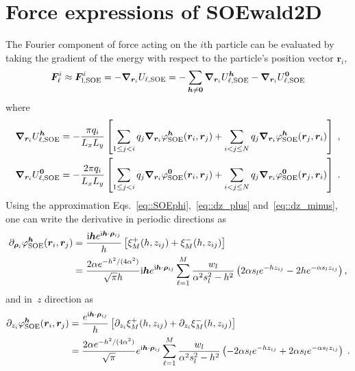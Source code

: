 \section{Force expressions of SOEwald2D} \label{app::force}

The Fourier component of force acting on the $i$th particle can be evaluated by taking the gradient of the energy with respect to the particle's position vector $\bm{r}_{i}$,
\begin{equation}\label{eq::Fi}
	\boldsymbol{F}_{\ell}^i  \approx \boldsymbol{F}^{i}_{\text{l},\text{SOE}} = -\boldsymbol{\nabla}_{\boldsymbol{r}_{i}} U_{\ell,\text{SOE}} =  -\sum_{\bm{h}\neq \bm{0}} \boldsymbol{\nabla}_{\boldsymbol{r}_{i}}U_{\ell,\text{SOE}}^{\boldsymbol{h}} -\boldsymbol{\nabla}_{\boldsymbol{r}_{i}} U_{\ell,\text{SOE}}^{\boldsymbol{0}}
\end{equation}
where
\begin{align}    
	\boldsymbol{\nabla}_{\boldsymbol{r}_{i}}U_{\ell,\text{SOE}}^{\boldsymbol{h}} &= - \frac{\pi q_{i}}{L_x L_y} \left[ \sum_{1 \leq j < i} q_{j} \boldsymbol{\nabla}_{\boldsymbol{r}_{i}} \varphi_{\text{SOE}}^{\boldsymbol{h}}(\boldsymbol{r}_{i}, \boldsymbol{r}_{j}) +  \sum_{i < j \leq N} q_{j} \boldsymbol{\nabla}_{\boldsymbol{r}_{i}} \varphi_{\text{SOE}}^{\boldsymbol{h}}(\boldsymbol{r}_{j}, \boldsymbol{r}_{i}) \right]\;,\\
	\boldsymbol{\nabla}_{\boldsymbol{r}_{i}} U_{\ell,\text{SOE}}^{\boldsymbol{0}} &= - \frac{2 \pi q_{i}}{L_x L_y} \left[ \sum_{1 \leq j < i} q_{j} \boldsymbol{\nabla}_{\boldsymbol{r}_{i}} \varphi^{\bm{0}}_{\text{SOE}}(\bm{r}_{i}, \bm{r}_{j}) + \sum_{i < j \leq N} q_{j} \boldsymbol{\nabla}_{\boldsymbol{r}_{i}} \varphi^{\bm{0}}_{\text{SOE}}(\bm{r}_{j}, \bm{r}_{i})\right]\;.
\end{align}
Using the approximation Eqs.~\eqref{eq::SOEphi},~\eqref{eq::dz_plus} and~\eqref{eq::dz_minus}, one can write the derivative in periodic directions as
\begin{equation}
	\begin{split}
		\partial_{\bm{\rho}_{i}} \varphi_{\text{SOE}}^{\boldsymbol{h}}(\boldsymbol{r}_{i}, \boldsymbol{r}_{j}) & = \frac{\mathrm{i} \boldsymbol{h} e^{ \mathrm{i} \boldsymbol{h} \cdot \boldsymbol{\rho}_{ij}}}{h} \left[\xi^{+}_M(h, z_{ij})+\xi^{-}_M(h, z_{ij})\right]\\
		&=\frac{2\alpha e^{-h^2/(4\alpha^2)}}{\sqrt{\pi}h} \mathrm{i} \bm{h}e^{\mathrm{i} \boldsymbol{h} \cdot \boldsymbol{\rho}_{ij}} \sum_{\ell = 1}^{M}  \frac{w_l}{\alpha^2 s_l^2 - h^2}\left( 2 \alpha s_l e^{-h z_{ij}} - 2 h e^{-\alpha s_l z_{ij}}\right),
	\end{split}
\end{equation}
and in~$z$ direction as
\begin{equation}\label{eq:z-der}
	\begin{split}
		\partial_{z_{i}} \varphi_{\text{SOE}}^{\boldsymbol{h}}(\boldsymbol{r}_{i}, \boldsymbol{r}_{j}) & = \frac{e^{\mathrm{i} \boldsymbol{h} \cdot \boldsymbol{\rho}_{ij}}}{h} \left[\partial_{z_{i}} \xi^{+}_M(h, z_{ij}) + \partial_{z_{i}} \xi^{-}_M(h, z_{ij})\right]\\
		&=\frac{2 \alpha e^{-h^2/(4\alpha^2)}}{\sqrt{\pi}}e^{ \mathrm{i} \boldsymbol{h} \cdot \boldsymbol{\rho}_{ij}} \sum_{\ell = 1}^{M}  \frac{w_l}{\alpha^2 s_l^2 - h^2}\left( - 2 \alpha s_l e^{-h z_{ij}} + 2 \alpha s_l e^{- \alpha s_l z_{ij}}\right)\;.
	\end{split}
\end{equation}
